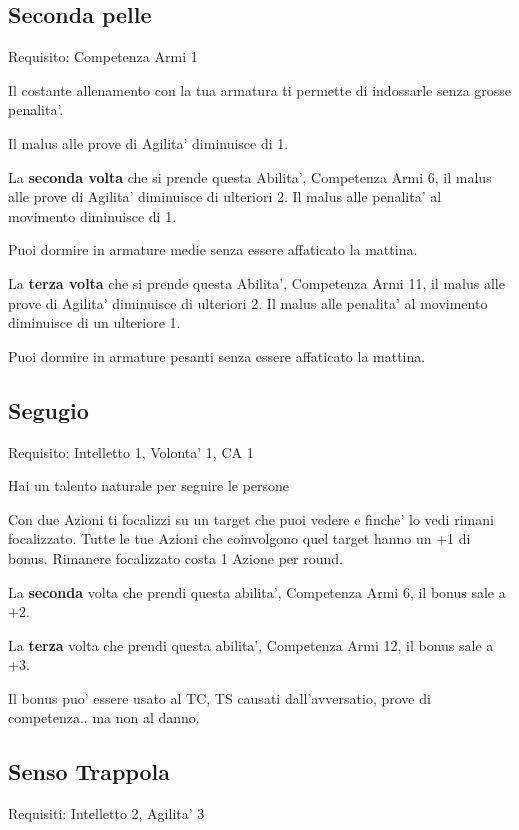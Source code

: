 \documentclass[a4paper,11pt,twoside,openany]{book}
\begin{document}
	\subsection{Seconda pelle}
	
	Requisito: Competenza Armi 1
	
	Il costante allenamento con la tua armatura ti permette di indossarle senza grosse penalita'.
	
	Il malus alle prove di Agilita' diminuisce di 1.
	
	La \textbf{seconda volta} che si prende questa Abilita', Competenza Armi 6, il malus alle prove di Agilita' diminuisce di ulteriori 2. 
	Il malus alle penalita' al movimento diminuisce di 1.
	
	Puoi dormire in armature medie senza essere affaticato la mattina.
	
	La \textbf{terza volta} che si prende questa Abilita', Competenza Armi 11, il malus alle prove di Agilita' diminuisce di ulteriori 2. Il malus alle penalita' al movimento diminuisce di un ulteriore 1. 
	
	Puoi dormire in armature pesanti senza essere affaticato la mattina.
	
	\subsection{Segugio}
	
	Requisito: Intelletto 1, Volonta' 1, CA 1
	
	Hai un talento naturale per seguire le persone
	
	Con due Azioni ti focalizzi su un target che puoi vedere e finche' lo vedi rimani focalizzato. Tutte le tue Azioni che coinvolgono quel target hanno un +1 di bonus. Rimanere focalizzato costa 1 Azione per round.
	
	La \textbf{seconda} volta che prendi questa abilita', Competenza Armi 6, il bonus sale a +2.
	
	La \textbf{terza} volta che prendi questa abilita', Competenza Armi 12, il bonus sale a +3.
	
	Il bonus puo' essere usato al TC, TS causati dall'avversatio, prove di competenza.. ma non al danno.
	
	\subsection{Senso Trappola}
	
	Requisiti: Intelletto 2, Agilita' 3
	
\end{document}
